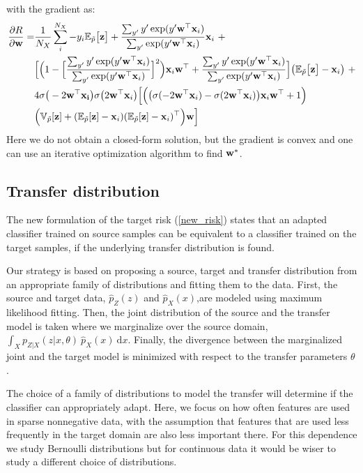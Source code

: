 \documentclass[twoside,11pt]{article}
\begin{document}
with the gradient as:
\begin{align}
\frac{\partial R }{\partial{\bf w}} =& \frac{1}{N_{X}} \sum_{i}^{N_{X}} -y_{i}\mathbb{E}_{\tilde{p}}\big[{\bf z}\big] + \frac{\sum_{y'} y'\exp(y'{\bf w}^{\top}{\bf x}_{i})}{\sum_{y'}\exp(y'{\bf w}^{\top}{\bf x}_{i})}{\bf x}_{i} \ + \nonumber \\
& \Big[\Big(1-\Big[\frac{\sum_{y'}y'\exp(y'{\bf w}^{\top}{\bf x}_{i})}{\sum_{y'}\exp(y'{\bf w}^{\top}{\bf x}_{i})}\Big]^{2}\Big) {\bf x}_{i}{\bf w}^{\top} + \frac{\sum_{y'} y'\exp(y'{\bf w}^{\top}{\bf x}_{i})}{\sum_{y'}\exp(y'{\bf w}^{\top}{\bf x}_{i})}\Big]\big(\mathbb{E}_{\tilde{p}}\big[{\bf z} \big]-{\bf x}_{i}\big) \ + \nonumber \\
& 4\sigma \big(-2{\bf w^{\top}x_{i}}\big)\sigma \big(2{\bf w^{\top}x}_{i}\big)\Big[\Big(\big(\sigma(-2{\bf w}^{\top}{\bf x}_{i}) - \sigma(2{\bf w}^{\top}{\bf x}_{i})\big){\bf x}_{i}{\bf w}^{\top} + 1\Big) \nonumber \\
& \Big(\mathbb{V}_{\tilde{p}}[{\bf z}] + (\mathbb{E}_{\tilde{p}}[{\bf z}]-{\bf x}_{i})(\mathbb{E}_{\tilde{p}}[{\bf z}]-{\bf x}_{i})^{\top} \Big){\bf w}\Big]
\end{align}
Here we do not obtain a closed-form solution, but the gradient is convex and one can use an iterative optimization algorithm to find ${\bf w}^{*}$.

\subsection{Transfer distribution}
The new formulation of the target risk (\ref{new_risk}) states that an adapted classifier trained on source samples can be equivalent to a classifier trained on the target samples, if the underlying transfer distribution is found.

Our strategy is based on proposing a source, target and transfer distribution from an appropriate family of distributions and fitting them to the data. First, the source and target data, $\hat{p}_{Z}(z)$ and $\hat{p}_{X}(x)$,are modeled using maximum likelihood fitting. Then, the joint distribution of the source and the transfer model is taken where we marginalize over the source domain, $\int_{X} p_{Z|X}(z|x, \theta) \ \hat{p}_{X}(x) \ \mathrm{d}x$. Finally, the divergence between the marginalized joint and the target model is minimized with respect to the transfer parameters $\theta$.

The choice of a family of distributions to model the transfer will determine if the classifier can appropriately adapt. Here, we focus on how often features are used in sparse nonnegative data, with the assumption that features that are used less frequently in the target domain are also less important there. For this dependence we study Bernoulli distributions but for continuous data it would be wiser to study a different choice of distributions.
\end{document}
